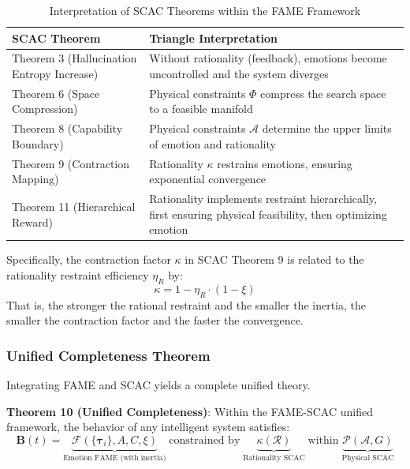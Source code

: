 \documentclass[12pt,a4paper]{article}
\theoremstyle{plain}
\newcommand{\ve}[1]{\bm{#1}}                    %
\newcommand{\Bvec}{\ve{B}}                        %
\begin{document}
\begin{table}[h]
\centering
\caption{Interpretation of SCAC Theorems within the FAME Framework}
\begin{tabular}{ll}
\toprule
\textbf{SCAC Theorem} & \textbf{Triangle Interpretation} \\
\midrule
Theorem 3 (Hallucination Entropy Increase) & Without rationality (feedback), emotions become uncontrolled and the system diverges \\
Theorem 6 (Space Compression) & Physical constraints $\Phi$ compress the search space to a feasible manifold \\
Theorem 8 (Capability Boundary) & Physical constraints $\mathcal{A}$ determine the upper limits of emotion and rationality \\
Theorem 9 (Contraction Mapping) & Rationality $\kappa$ restrains emotions, ensuring exponential convergence \\
Theorem 11 (Hierarchical Reward) & Rationality implements restraint hierarchically, first ensuring physical feasibility, then optimizing emotion \\
\bottomrule
\end{tabular}
\end{table}

Specifically, the contraction factor $\kappa$ in SCAC Theorem 9 is related to the rationality restraint efficiency $\eta_R$ by:
\begin{equation}
\kappa = 1 - \eta_R \cdot (1 - \xi)
\label{eq:kappa_eta}
\end{equation}
That is, the stronger the rational restraint and the smaller the inertia, the smaller the contraction factor and the faster the convergence.

\subsubsection{Unified Completeness Theorem}

Integrating FAME and SCAC yields a complete unified theory.

\textbf{Theorem 10 (Unified Completeness)}: Within the FAME-SCAC unified framework, the behavior of any intelligent system satisfies:
\begin{equation}
\Bvec(t) = \underbrace{\mathcal{F}(\{\ve{\tau}_i\}, A, C, \xi)}_{\text{Emotion FAME (with inertia)}} \; \text{constrained by} \; \underbrace{\kappa(\mathcal{R})}_{\text{Rationality SCAC}} \; \text{within} \; \underbrace{\mathcal{P}(\mathcal{A}, G)}_{\text{Physical SCAC}}
\label{eq:unified}
\end{equation}
\end{document}
